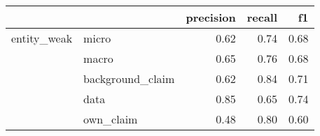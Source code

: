 \begin{tabular}{llrrr}
\toprule
            &           &  precision &  recall &   f1 \\
\midrule
entity\_weak & micro &       0.62 &    0.74 & 0.68 \\
            & macro &       0.65 &    0.76 & 0.68 \\
            & background\_claim &       0.62 &    0.84 & 0.71 \\
            & data &       0.85 &    0.65 & 0.74 \\
            & own\_claim &       0.48 &    0.80 & 0.60 \\
\bottomrule
\end{tabular}
